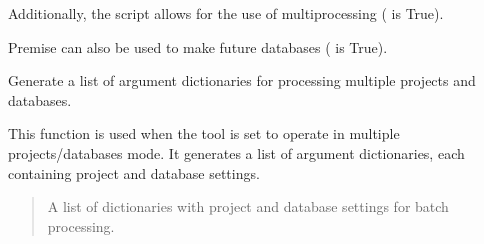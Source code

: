 \documentclass[letterpaper,10pt,english]{sphinxmanual}
\begin{document}
\sphinxAtStartPar
Additionally, the script allows for the use of multiprocessing ( is True).

\sphinxAtStartPar
Premise can also be used to make future databases ( is True).

\begin{fulllineitems}
\label{\detokenize{configuration_api:config.user_settings.generate_args_list}}
\pysigstartsignatures
{}
\pysigstopsignatures
\sphinxAtStartPar
Generate a list of argument dictionaries for processing multiple projects and databases.

\sphinxAtStartPar
This function is used when the tool is set to operate in multiple projects/databases mode.
It generates a list of argument dictionaries, each containing project and database settings.
\begin{quote}\begin{description}
\sphinxAtStartPar
A list of dictionaries with project and database settings for batch processing.

\end{description}\end{quote}

\end{fulllineitems}
\end{document}
